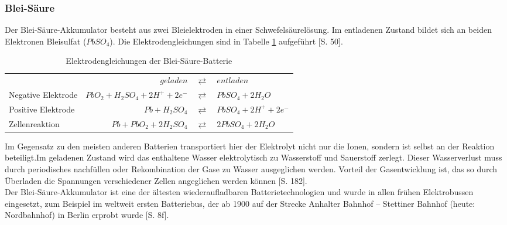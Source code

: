 \subsubsection{Blei-Säure}
Der Blei-Säure-Akkumulator besteht aus zwei Bleielektroden in einer Schwefelsäurelösung. Im entladenen Zustand bildet sich an beiden Elektronen Bleisulfat ($PbSO_4$). Die Elektrodengleichungen sind in Tabelle \ref{Pb} aufgeführt \cite{KiehneBattery}[S. 50].\\
\begin{table}\centering
  \begin{tabularx}{\linewidth}{XrcX}
  	                   &                       $geladen$ & $\rightleftarrows$ & $entladen$            \\
  	Negative Elektrode & $PbO_2 + H_2SO_4 + 2H^+ + 2e^-$ & $\rightleftarrows$ & $PbSO_4 + 2H_2O$       \\
  	Positive Elektrode &                  $Pb + H_2SO_4$ & $\rightleftarrows$ & $PbSO_4 + 2H^+ + 2e^-$ \\ \midrule
  	Zellenreaktion     &         $Pb + PbO_2 + 2H_2SO_4$ & $\rightleftarrows$ & $2PbSO_4 + 2H_2O$
  \end{tabularx}
  \caption{Elektrodengleichungen der Blei-Säure-Batterie}
  \label{Pb}
\end{table}
Im Gegensatz zu den meisten anderen Batterien transportiert hier der Elektrolyt nicht nur die Ionen, sondern ist selbst an der Reaktion beteiligt.Im geladenen Zustand wird das enthaltene Wasser elektrolytisch zu Wasserstoff und Sauerstoff zerlegt. Dieser Wasserverlust muss durch periodisches nachfüllen oder Rekombination der Gase zu Wasser ausgeglichen werden. Vorteil der Gasentwicklung ist, das so durch Überladen die Spannungen verschiedener Zellen angeglichen werden können \cite{tub_aleph001746639}[S. 182].\\
Der Blei-Säure-Akkumulator ist eine der ältesten wiederaufladbaren Batterietechnologien und wurde in allen frühen Elektrobussen eingesetzt, zum Beispiel im weltweit ersten Batteriebus, der ab 1900 auf der Strecke Anhalter Bahnhof – Stettiner Bahnhof (heute: Nordbahnhof) in Berlin erprobt wurde \cite{Risch:1957}[S. 8f].

